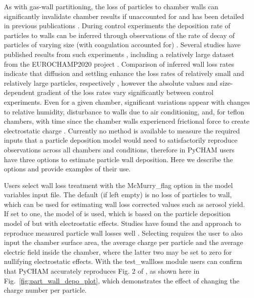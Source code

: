 \documentclass[gmd, manuscript]{copernicus}
\begin{document}
As with gas-wall partitioning, the loss of particles to chamber walls can significantly invalidate chamber results if unaccounted for and has been detailed in previous publications \citep{Crump1981, McMurry1985, Nah2017, Wang2018}.  During control experiments the deposition rate of particles to walls can be inferred through observations of the rate of decay of particles of varying size (with coagulation accounted for) \citep{Charan2019}.  Several studies have published results from such experiments \citep{McMurry1985, Wang2018}, including a relatively large dataset from the EUROCHAMP2020 project \citep{EUROCHAMP2020}.  Comparison of inferred wall loss rates indicate that diffusion and settling enhance the loss rates of relatively small and relatively large particles, respectively \citep{Crump1981}, however the absolute values and size-dependent gradient of the loss rates vary significantly between control experiments.  Even for a given chamber, significant variations appear with changes to relative humidity, disturbance to walls due to air conditioning, and, for teflon chambers, with time since the chamber walls experienced frictional force to create electrostatic charge \citep{Wang2018}.  Currently no method is available to measure the required inputs that a particle deposition model would need to satisfactorily reproduce observations across all chambers and conditions, therefore in PyCHAM users have three options to estimate particle wall deposition.  Here we describe the options and provide examples of their use.

Users select wall loss treatment with the McMurry\_flag option in the model variables input file.  The default (if left empty) is no loss of particles to wall, which can be used for estimating wall loss corrected values such as aerosol yield.  If set to one, the model of \citet{McMurry1985} is used, which is based on the particle deposition model of \citet{Crump1981} but with electrostatic effects.  Studies have found the \citet{Crump1981} and \citet{McMurry1985} approach to reproduce measured particle wall losses well \citep{Chen1992, Kim2001}.  Selecting \citet{McMurry1985} requires the user to also input the chamber surface area, the average charge per particle and the average electric field inside the chamber, where the latter two may be set to zero for nullifying electrostatic effects.  With the test\_wallloss module users can confirm that PyCHAM accurately reproduces Fig. 2 of \citet{McMurry1985}, as shown here in Fig.~\ref{fig:part_wall_depo_plot}, which demonstrates the effect of changing the charge number per particle.
\end{document}
